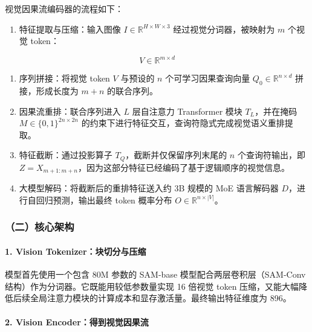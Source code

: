 视觉因果流编码器的流程如下：

\begin{enumerate}
\def\labelenumi{\arabic{enumi}.}
\tightlist
\item
{}
  特征提取与压缩：输入图像 \(I\in\mathbb{R}^{H\times W\times 3}\) 经过视觉分词器，被映射为 \(m\) 个视觉 token：
\end{enumerate}

\[
V\in\mathbb{R}^{m\times d}
\]

\begin{enumerate}
\def\labelenumi{\arabic{enumi}.}
\setcounter{enumi}{1}
\tightlist
\item
  序列拼接：将视觉 token \(V\) 与预设的 \(n\) 个可学习因果查询向量 \(Q_0\in\mathbb{R}^{n\times d}\) 拼接，形成长度为 \(m+n\) 的联合序列。
\item
  因果流重排：联合序列进入 \(L\) 层自注意力 Transformer 模块 \(T_L\)，并在掩码 \(M\in\{0,1\}^{2n\times2n}\) 的约束下进行特征交互，查询符隐式完成视觉语义重排提取。
\item
  特征截断：通过投影算子 \(T_Q\)，截断并仅保留序列末尾的 \(n\) 个查询符输出，即 \(Z=X_{m+1:m+n}\)，因为这部分特征已经编码了基于逻辑顺序的视觉信息。
\item
  大模型解码：将截断后的重排特征送入约 3B 规模的 MoE 语言解码器 \(D\)，进行自回归预测，输出最终 token 概率分布 \(O\in\mathbb{R}^{n\times |V|}\)。
\end{enumerate}

\hypertarget{ux4e8cux6838ux5fc3ux67b6ux6784-1}{%
\subsubsection{（二）核心架构}\label{ux4e8cux6838ux5fc3ux67b6ux6784-1}}

\hypertarget{vision-tokenizerux5757ux5207ux5206ux4e0eux538bux7f29}{%
\paragraph{1. Vision Tokenizer：块切分与压缩}\label{vision-tokenizerux5757ux5207ux5206ux4e0eux538bux7f29}}

模型首先使用一个包含 80M 参数的 SAM-base 模型配合两层卷积层（SAM-Conv 结构）作为分词器。它既能用较低参数量实现 16 倍视觉 token 压缩，又能大幅降低后续全局注意力模块的计算成本和显存激活量。最终输出特征维度为 896。

\hypertarget{vision-encoderux5f97ux5230ux89c6ux89c9ux56e0ux679cux6d41}{%
\paragraph{2. Vision Encoder：得到视觉因果流}\label{vision-encoderux5f97ux5230ux89c6ux89c9ux56e0ux679cux6d41}}

